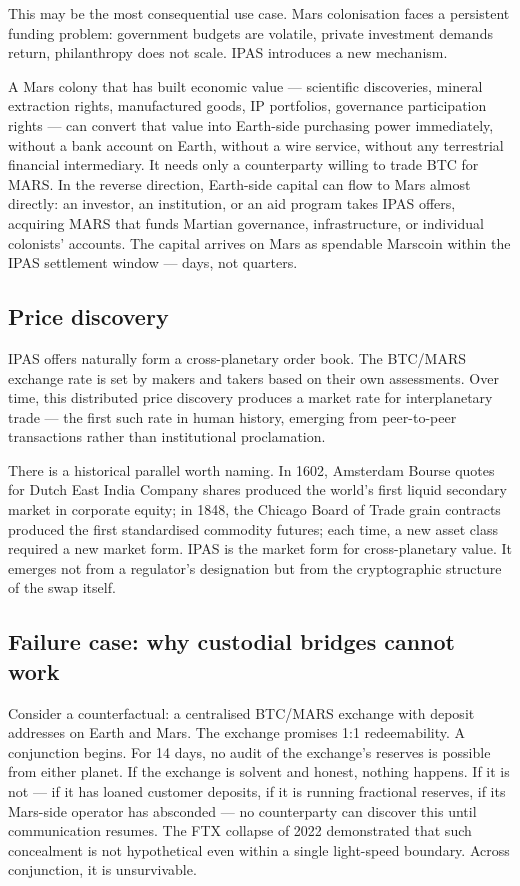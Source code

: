 \documentclass[11pt]{article}
\begin{document}
This may be the most consequential use case. Mars colonisation faces a persistent funding problem: government budgets are volatile, private investment demands return, philanthropy does not scale. IPAS introduces a new mechanism.

A Mars colony that has built economic value --- scientific discoveries, mineral extraction rights, manufactured goods, IP portfolios, governance participation rights --- can convert that value into Earth-side purchasing power immediately, without a bank account on Earth, without a wire service, without any terrestrial financial intermediary. It needs only a counterparty willing to trade BTC for MARS. In the reverse direction, Earth-side capital can flow to Mars almost directly: an investor, an institution, or an aid program takes IPAS offers, acquiring MARS that funds Martian governance, infrastructure, or individual colonists' accounts. The capital arrives on Mars as spendable Marscoin within the IPAS settlement window --- days, not quarters.

\subsection{Price discovery}

IPAS offers naturally form a cross-planetary order book. The BTC/MARS exchange rate is set by makers and takers based on their own assessments. Over time, this distributed price discovery produces a market rate for interplanetary trade --- the first such rate in human history, emerging from peer-to-peer transactions rather than institutional proclamation.

There is a historical parallel worth naming. In 1602, Amsterdam Bourse quotes for Dutch East India Company shares produced the world's first liquid secondary market in corporate equity; in 1848, the Chicago Board of Trade grain contracts produced the first standardised commodity futures; each time, a new asset class required a new market form. IPAS is the market form for cross-planetary value. It emerges not from a regulator's designation but from the cryptographic structure of the swap itself.

\subsection{Failure case: why custodial bridges cannot work}

Consider a counterfactual: a centralised BTC/MARS exchange with deposit addresses on Earth and Mars. The exchange promises 1:1 redeemability. A conjunction begins. For 14 days, no audit of the exchange's reserves is possible from either planet. If the exchange is solvent and honest, nothing happens. If it is not --- if it has loaned customer deposits, if it is running fractional reserves, if its Mars-side operator has absconded --- no counterparty can discover this until communication resumes. The FTX collapse of 2022 demonstrated that such concealment is not hypothetical even within a single light-speed boundary. Across conjunction, it is unsurvivable.
\end{document}
